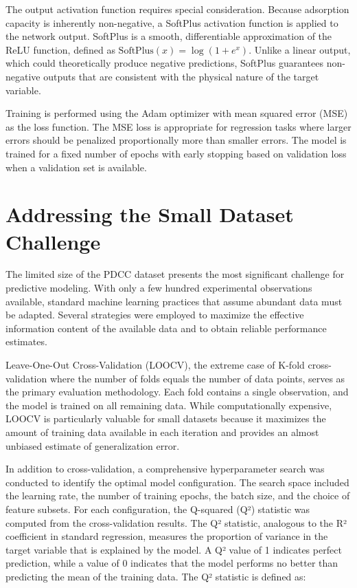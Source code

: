 The output activation function requires special consideration. Because adsorption capacity is inherently non-negative, a SoftPlus activation function is applied to the network output. SoftPlus is a smooth, differentiable approximation of the ReLU function, defined as $\text{SoftPlus}(x) = \log(1 + e^x)$. Unlike a linear output, which could theoretically produce negative predictions, SoftPlus guarantees non-negative outputs that are consistent with the physical nature of the target variable.

Training is performed using the Adam optimizer with mean squared error (MSE) as the loss function. The MSE loss is appropriate for regression tasks where larger errors should be penalized proportionally more than smaller errors. The model is trained for a fixed number of epochs with early stopping based on validation loss when a validation set is available.

\section{Addressing the Small Dataset Challenge}
\label{sec:small_dataset}

The limited size of the PDCC dataset presents the most significant challenge for predictive modeling. With only a few hundred experimental observations available, standard machine learning practices that assume abundant data must be adapted. Several strategies were employed to maximize the effective information content of the available data and to obtain reliable performance estimates.

Leave-One-Out Cross-Validation (LOOCV), the extreme case of K-fold cross-validation where the number of folds equals the number of data points, serves as the primary evaluation methodology. Each fold contains a single observation, and the model is trained on all remaining data. While computationally expensive, LOOCV is particularly valuable for small datasets because it maximizes the amount of training data available in each iteration and provides an almost unbiased estimate of generalization error.

In addition to cross-validation, a comprehensive hyperparameter search was conducted to identify the optimal model configuration. The search space included the learning rate, the number of training epochs, the batch size, and the choice of feature subsets. For each configuration, the Q-squared (Q²) statistic was computed from the cross-validation results. The Q² statistic, analogous to the R² coefficient in standard regression, measures the proportion of variance in the target variable that is explained by the model. A Q² value of 1 indicates perfect prediction, while a value of 0 indicates that the model performs no better than predicting the mean of the training data. The Q² statistic is defined as:

